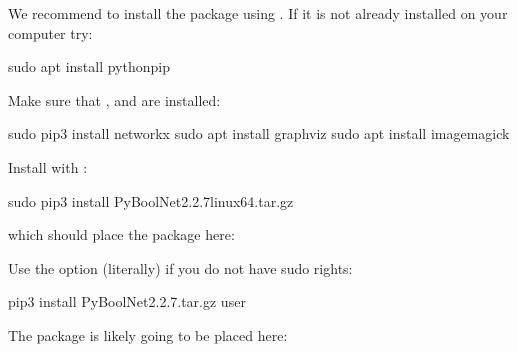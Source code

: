 \documentclass[letterpaper,10pt,english]{sphinxmanual}
\begin{document}
We recommend to install the package using . If it is not already installed on your computer try:

\begin{sphinxVerbatim}[commandchars=\\\{\}]
\PYGZdl{} sudo apt install python\PYGZhy{}pip
\end{sphinxVerbatim}

Make sure that {\hyperref[\detokenize{Installation:installation-networkx}]{}}, {\hyperref[\detokenize{Installation:installation-graphviz}]{}} and {\hyperref[\detokenize{Installation:installation-imagemagick}]{}} are installed:

\begin{sphinxVerbatim}[commandchars=\\\{\}]
\PYGZdl{} sudo pip3 install networkx
\PYGZdl{} sudo apt install graphviz
\PYGZdl{} sudo apt install imagemagick
\end{sphinxVerbatim}

Install  with :

\begin{sphinxVerbatim}[commandchars=\\\{\}]
\PYGZdl{} sudo pip3 install PyBoolNet\PYGZhy{}2.2.7\PYGZus{}linux64.tar.gz
\end{sphinxVerbatim}

which should place the package here:

\begin{sphinxVerbatim}[commandchars=\\\{\}]
\end{sphinxVerbatim}

Use the option  (literally) if you do not have sudo rights:

\begin{sphinxVerbatim}[commandchars=\\\{\}]
\PYGZdl{} pip3 install PyBoolNet\PYGZhy{}2.2.7.tar.gz \PYGZhy{}\PYGZhy{}user
\end{sphinxVerbatim}

The package is likely going to be placed here:
\end{document}
